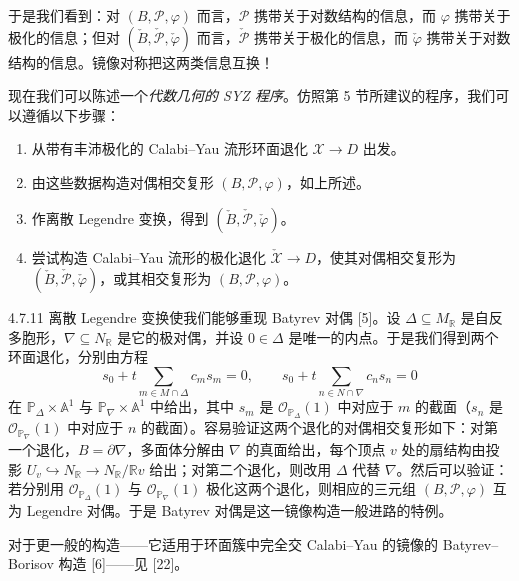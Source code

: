 于是我们看到：对 $(B,\mathcal{P},\varphi)$ 而言，$\mathcal{P}$ 携带关于对数结构的信息，而 $\varphi$ 携带关于极化的信息；但对 $(\check B,\check{\mathcal{P}},\check\varphi)$ 而言，$\check{\mathcal{P}}$ 携带关于极化的信息，而 $\check\varphi$ 携带关于对数结构的信息。镜像对称把这两类信息互换！

现在我们可以陈述一个\emph{代数几何的 SYZ 程序}。仿照第 5 节所建议的程序，我们可以遵循以下步骤：
\begin{enumerate}
\item 从带有丰沛极化的 Calabi--Yau 流形环面退化 $\mathcal{X}\to D$ 出发。
\item 由这些数据构造对偶相交复形 $(B,\mathcal{P},\varphi)$，如上所述。
\item 作离散 Legendre 变换，得到 $(\check B,\check{\mathcal{P}},\check\varphi)$。
\item 尝试构造 Calabi--Yau 流形的极化退化 $\check{\mathcal{X}}\to D$，使其对偶相交复形为 $(\check B,\check{\mathcal{P}},\check\varphi)$，或其相交复形为 $(B,\mathcal{P},\varphi)$。
\end{enumerate}
\begin{example}{4.7.11}
离散 Legendre 变换使我们能够重现 Batyrev 对偶 [5]。设 $\Delta\subseteq M_{\mathbb{R}}$ 是自反多胞形，$\nabla\subseteq N_{\mathbb{R}}$ 是它的极对偶，并设 $0\in\Delta$ 是唯一的内点。于是我们得到两个环面退化，分别由方程
\[
s_0+t\sum_{m\in M\cap\Delta}c_ms_m=0,\qquad
s_0+t\sum_{n\in N\cap\nabla}c_ns_n=0
\]
在 $\mathbb{P}_\Delta\times\mathbb{A}^1$ 与 $\mathbb{P}_\nabla\times\mathbb{A}^1$ 中给出，其中 $s_m$ 是 $\mathcal{O}_{\mathbb{P}_\Delta}(1)$ 中对应于 $m$ 的截面（$s_n$ 是 $\mathcal{O}_{\mathbb{P}_\nabla}(1)$ 中对应于 $n$ 的截面）。容易验证这两个退化的对偶相交复形如下：对第一个退化，$B=\partial\nabla$，多面体分解由 $\nabla$ 的真面给出，每个顶点 $v$ 处的扇结构由投影 $U_v\hookrightarrow N_{\mathbb{R}}\to N_{\mathbb{R}}/\mathbb{R}v$ 给出；对第二个退化，则改用 $\Delta$ 代替 $\nabla$。然后可以验证：若分别用 $\mathcal{O}_{\mathbb{P}_\Delta}(1)$ 与 $\mathcal{O}_{\mathbb{P}_\nabla}(1)$ 极化这两个退化，则相应的三元组 $(B,\mathcal{P},\varphi)$ 互为 Legendre 对偶。于是 Batyrev 对偶是这一镜像构造一般进路的特例。
\end{example}

对于更一般的构造------它适用于环面簇中完全交 Calabi--Yau 的镜像的 Batyrev--Borisov 构造 [6]------见 [22]。

